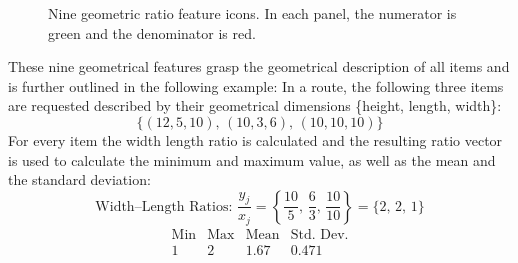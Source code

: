 \begin{figure}[ht]
	\centering

	\vspace{25pt}
	\vspace{25pt}
	\caption[Nine geometric ratio feature icons.]{Nine geometric ratio feature icons. In each panel, the \textcolor{numC}{numerator is green}
		and the \textcolor{denC}{denominator is red}.
		\label{fig:geometrical_ratio_features}}
\end{figure}

These nine geometrical features grasp the geometrical description of all items and is further outlined in the following example:
In a route, the following three items are requested described by their geometrical dimensions \{height, length, width\}:
\[
	\{(12,5,10),\,(10,3,6),\,(10,10,10)\}
\]
For every item the width length ratio is calculated and the resulting ratio vector is used to calculate the minimum and maximum value,
as well as the mean and the standard deviation:
\[
	\text{Width--Length Ratios: }
	\frac{y_j}{x_j} = \left\{\frac{10}{5},\,\frac{6}{3},\,\frac{10}{10}\right\} = \{2,\,2,\,1\}
\]
\[
	\begin{array}{c|c|c|c}
		\text{Min} & \text{Max} & \text{Mean} & \text{Std. Dev.} \\
		\hline
		1          & 2          & 1.67        & 0.471            \\
	\end{array}
\]

